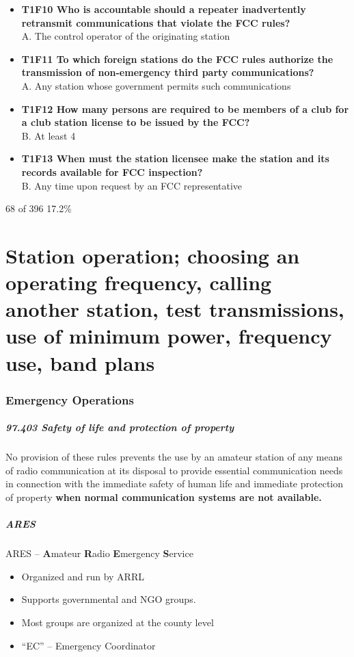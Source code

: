 \documentclass[10pt]{beamer}
\begin{document}
\begin{frame}
\begin{itemize}[<+->]
\item\textbf{T1F10 Who is accountable should a repeater inadvertently retransmit communications that violate the FCC rules?} \hfil\\A. The control operator of the originating station
\item\textbf{T1F11 To which foreign stations do the FCC rules authorize the transmission of non-emergency third party communications?} \hfil\\A. Any station whose government permits such communications
\item\textbf{T1F12 How many persons are required to be members of a club for a club station license to be issued by the FCC?} \hfil\\B. At least 4
\item\textbf{T1F13 When must the station licensee make the station and its records available for FCC inspection?}\hfil\\ B. Any time upon request by an FCC representative
\end{itemize}
\tiny 68 of 396 17.2\%
\end{frame}

\part{Station operation; choosing an operating frequency, calling another station, test transmissions, use of minimum power, frequency use, band plans}

\section{Emergency Operations}
\begin{frame}
\frametitle{97.403 Safety of life and protection of property}
No provision of these rules prevents the use by an amateur station of any means of radio communication at its disposal to provide essential communication needs in connection with the immediate safety of human life and immediate protection of property \textbf<2->{when normal communication systems are not available.}
\end{frame}

\begin{frame}
\frametitle{ARES}
ARES – \textbf{A}mateur \textbf{R}adio \textbf{E}mergency \textbf{S}ervice
\begin{itemize}
\item Organized and run by ARRL
\item Supports governmental and NGO groups.
\item Most groups are organized at the county level
\item “EC” – Emergency Coordinator
\end{itemize}
\end{frame}
\end{document}
